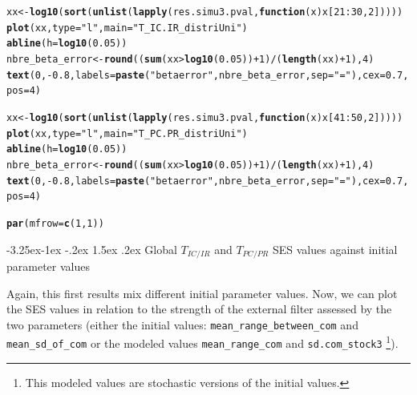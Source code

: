 \documentclass[12pt]{article}\usepackage[]{graphicx}\usepackage[]{color}
\makeatletter
\newcommand{\hlnum}[1]{\textcolor[rgb]{0.686,0.059,0.569}{#1}}%
\newcommand{\hlstr}[1]{\textcolor[rgb]{0.192,0.494,0.8}{#1}}%
\newcommand{\hlopt}[1]{\textcolor[rgb]{0,0,0}{#1}}%
\newcommand{\hlstd}[1]{\textcolor[rgb]{0.345,0.345,0.345}{#1}}%
\newcommand{\hlkwa}[1]{\textcolor[rgb]{0.161,0.373,0.58}{\textbf{#1}}}%
\newcommand{\hlkwb}[1]{\textcolor[rgb]{0.69,0.353,0.396}{#1}}%
\newcommand{\hlkwc}[1]{\textcolor[rgb]{0.333,0.667,0.333}{#1}}%
\newcommand{\hlkwd}[1]{\textcolor[rgb]{0.737,0.353,0.396}{\textbf{#1}}}%
\newenvironment{kframe}{%
 \def\at@end@of@kframe{}%
 \ifinner\ifhmode%
  \def\at@end@of@kframe{\end{minipage}}%
  \begin{minipage}{\columnwidth}%
 \fi\fi%
 \def\FrameCommand##1{\hskip\@totalleftmargin \hskip-\fboxsep
 \colorbox{shadecolor}{##1}\hskip-\fboxsep
     \hskip-\linewidth \hskip-\@totalleftmargin \hskip\columnwidth}%
 \MakeFramed {\advance\hsize-\width
   \@totalleftmargin\z@ \linewidth\hsize
   \@setminipage}}%
 {\par\unskip\endMakeFramed%
 \at@end@of@kframe}
\newenvironment{knitrout}{}{} %
\newcounter {subsubsubsection}[subsubsection]
\newcommand\subsubsubsection{\@startsection{subsubsubsection}{4}{\z@}%
          {-3.25ex\@plus -1ex \@minus -.2ex}%
          {1.5ex \@plus .2ex}%
          {\normalfont\normalsize\bfseries}}
\makeatother
\begin{document}
\begin{knitrout}
\begin{kframe}
\begin{alltt}
\hlstd{xx} \hlkwb{<-} \hlkwd{log10}\hlstd{(}\hlkwd{sort}\hlstd{(}\hlkwd{unlist}\hlstd{(}\hlkwd{lapply}\hlstd{(res.simu3.pval,} \hlkwa{function}\hlstd{(}\hlkwc{x}\hlstd{) x[}\hlnum{21}\hlopt{:}\hlnum{30}\hlstd{,} \hlnum{2}\hlstd{]))))}
\hlkwd{plot}\hlstd{(xx,} \hlkwc{type} \hlstd{=} \hlstr{"l"}\hlstd{,} \hlkwc{main} \hlstd{=} \hlstr{"T_IC.IR_distriUni"}\hlstd{)}
\hlkwd{abline}\hlstd{(}\hlkwc{h} \hlstd{=} \hlkwd{log10}\hlstd{(}\hlnum{0.05}\hlstd{))}
\hlstd{nbre_beta_error} \hlkwb{<-} \hlkwd{round}\hlstd{((}\hlkwd{sum}\hlstd{(xx}\hlopt{>}\hlkwd{log10}\hlstd{(}\hlnum{0.05}\hlstd{))}\hlopt{+}\hlnum{1}\hlstd{)}\hlopt{/}\hlstd{(}\hlkwd{length}\hlstd{(xx)}\hlopt{+}\hlnum{1}\hlstd{),} \hlnum{4}\hlstd{)}
\hlkwd{text}\hlstd{(}\hlnum{0}\hlstd{,} \hlopt{-}\hlnum{0.8}\hlstd{,} \hlkwc{labels} \hlstd{=} \hlkwd{paste}\hlstd{(}\hlstr{"beta error"}\hlstd{, nbre_beta_error,} \hlkwc{sep} \hlstd{=} \hlstr{" = "}\hlstd{),} \hlkwc{cex} \hlstd{=} \hlnum{0.7}\hlstd{,} \hlkwc{pos} \hlstd{=} \hlnum{4}\hlstd{)}

\hlstd{xx} \hlkwb{<-} \hlkwd{log10}\hlstd{(}\hlkwd{sort}\hlstd{(}\hlkwd{unlist}\hlstd{(}\hlkwd{lapply}\hlstd{(res.simu3.pval,} \hlkwa{function}\hlstd{(}\hlkwc{x}\hlstd{) x[}\hlnum{41}\hlopt{:}\hlnum{50}\hlstd{,} \hlnum{2}\hlstd{]))))}
\hlkwd{plot}\hlstd{(xx,} \hlkwc{type} \hlstd{=} \hlstr{"l"}\hlstd{,} \hlkwc{main} \hlstd{=} \hlstr{"T_PC.PR_distriUni"}\hlstd{)}
\hlkwd{abline}\hlstd{(}\hlkwc{h} \hlstd{=} \hlkwd{log10}\hlstd{(}\hlnum{0.05}\hlstd{))}
\hlstd{nbre_beta_error} \hlkwb{<-} \hlkwd{round}\hlstd{((}\hlkwd{sum}\hlstd{(xx}\hlopt{>}\hlkwd{log10}\hlstd{(}\hlnum{0.05}\hlstd{))}\hlopt{+}\hlnum{1}\hlstd{)}\hlopt{/}\hlstd{(}\hlkwd{length}\hlstd{(xx)}\hlopt{+}\hlnum{1}\hlstd{),} \hlnum{4}\hlstd{)}
\hlkwd{text}\hlstd{(}\hlnum{0}\hlstd{,} \hlopt{-}\hlnum{0.8}\hlstd{,} \hlkwc{labels} \hlstd{=} \hlkwd{paste}\hlstd{(}\hlstr{"beta error"}\hlstd{, nbre_beta_error,} \hlkwc{sep} \hlstd{=} \hlstr{" = "}\hlstd{),} \hlkwc{cex} \hlstd{=} \hlnum{0.7}\hlstd{,} \hlkwc{pos} \hlstd{=} \hlnum{4}\hlstd{)}

\hlkwd{par}\hlstd{(}\hlkwc{mfrow} \hlstd{=} \hlkwd{c}\hlstd{(}\hlnum{1}\hlstd{,} \hlnum{1}\hlstd{))}
\end{alltt}
\end{kframe}
\end{knitrout}


  \subsubsubsection {Global $T_{IC/IR}$ and $T_{PC/PR}$ SES values against initial parameter values}
  
Again, this first results mix different initial parameter values. Now, we can plot the SES values in relation to the strength of the external filter assessed by the two parameters (either the initial values: \texttt{mean\_range\_between\_com} and \texttt{mean\_sd\_of\_com} or the modeled values \texttt{mean\_{}range\_{}com} and \texttt{sd.com\_{}stock3} \footnote{This modeled values are stochastic versions of the initial values.}). 
\end{document}
